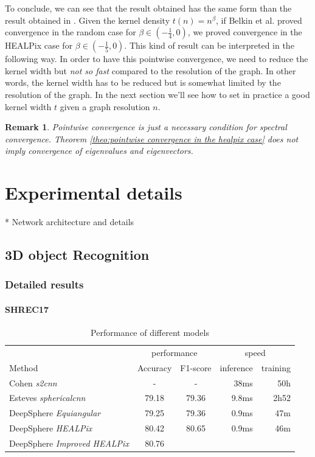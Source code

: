 \documentclass{article} %
\newtheorem*{remark}{Remark}
\begin{document}
To conclude, we can see that the result obtained has the same form than the result obtained in \cite{belkin2005towards}. Given the kernel density $t(n)=n^\beta$, if Belkin et al. proved convergence in the random case for $\beta \in (-\frac{1}{4}, 0)$, we proved convergence in the HEALPix case for $\beta \in (-\frac{1}{5}, 0)$. This kind of result can be interpreted in the following way. In order to have this pointwise convergence, we need to reduce the kernel width but \textit{not so fast} compared to the resolution of the graph. In other words, the kernel width has to be reduced but is somewhat limited by the resolution of the graph. In the next section we'll see how to set in practice a good kernel width $t$ given a graph resolution $n$.
\begin{remark}
	Pointwise convergence is just a necessary condition for spectral convergence.  Theorem \ref{theo:pointwise convergence in the healpix case} does not imply convergence of eigenvalues and eigenvectors.
\end{remark}

\section{Experimental details}

* Network architecture and details

\subsection{3D object Recognition}
\subsubsection*{Detailed results}
\paragraph*{SHREC17}

\begin{table}
    \centering
    \begin{tabular}{l|c c r r}
        \multicolumn{1}{l}{} & \multicolumn{2}{c}{performance} & \multicolumn{2}{c}{speed}\\
        \cmidrule(lr){2-3} \cmidrule(lr){4-5}
        \multicolumn{1}{l}{Method} & Accuracy & F1-score & inference & training \\ \hline
        Cohen \emph{s2cnn} & - & - & 38ms & 50h\\
        Esteves \emph{sphericalcnn} & 79.18 & 79.36 & 9.8ms & 2h52\\ \hline
        DeepSphere \emph{Equiangular} & 79.25 & 79.36 & 0.9ms & 47m \\
        DeepSphere \emph{HEALPix} & 80.42 & 80.65 & 0.9ms & 46m\\
        DeepSphere \emph{Improved HEALPix} & 80.76 & & &
    \end{tabular}
    \caption{Performance of different models}
    \label{tab:SHREC17_class}
\end{table}
\end{document}
